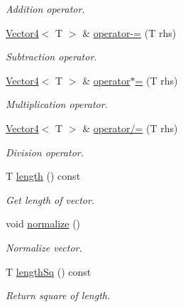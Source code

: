 \begin{DoxyCompactItemize}
\begin{DoxyCompactList}\small\item\em Addition operator. \item\end{DoxyCompactList}\item 
\hyperlink{class_vector4}{Vector4}$<$ T $>$ \& \hyperlink{class_vector4_a908ced73c807151645080dc7bb9f8516}{operator-\/=} (T rhs)
\begin{DoxyCompactList}\small\item\em Subtraction operator. \item\end{DoxyCompactList}\item 
\hyperlink{class_vector4}{Vector4}$<$ T $>$ \& \hyperlink{class_vector4_a1caac7a97dae951da9039049c93db73f}{operator$\ast$=} (T rhs)
\begin{DoxyCompactList}\small\item\em Multiplication operator. \item\end{DoxyCompactList}\item 
\hyperlink{class_vector4}{Vector4}$<$ T $>$ \& \hyperlink{class_vector4_a2355ed974eac90e81de045dbf522b433}{operator/=} (T rhs)
\begin{DoxyCompactList}\small\item\em Division operator. \item\end{DoxyCompactList}\item 
T \hyperlink{class_vector4_a2242e63f194ec1a46efaae9417f3593c}{length} () const 
\begin{DoxyCompactList}\small\item\em Get length of vector. \item\end{DoxyCompactList}\item 
void \hyperlink{class_vector4_a854ae5d3ecf13efd5251a1e32c43f1b3}{normalize} ()
\begin{DoxyCompactList}\small\item\em Normalize vector. \item\end{DoxyCompactList}\item 
T \hyperlink{class_vector4_a32ac452a5ba86aaf90a3d75709990f0c}{lengthSq} () const 
\begin{DoxyCompactList}\small\item\em Return square of length. \item\end{DoxyCompactList}\item 

\end{DoxyCompactItemize}
